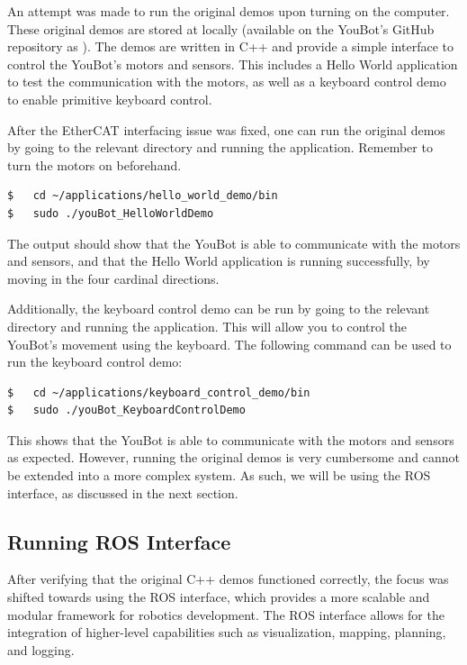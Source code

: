 \documentclass[a4paper, 12pt]{article}
\newif\ifshownotes
\newcommand{\notes}[1]{\ifshownotes\textcolor{blue}{#1}\fi}
\newcommand{\code}[1]{\texttt{\detokenize{#1}}}
\begin{document}
    An attempt was made to run the original demos upon turning on the computer. These original demos are stored at \code{~/applications} locally (available on the YouBot's GitHub repository as \code{youbot_applications}). The demos are written in C++ and provide a simple interface to control the YouBot's motors and sensors. This includes a Hello World application to test the communication with the motors, as well as a keyboard control demo to enable primitive keyboard control.

    
    After the EtherCAT interfacing issue was fixed, one can run the original demos by going to the relevant directory and running the application. Remember to turn the motors on beforehand. 
    \begin{lstlisting}[style=plain]
$   cd ~/applications/hello_world_demo/bin
$   sudo ./youBot_HelloWorldDemo
    \end{lstlisting}
    \notes{add the feedback from the demo here}
    
    The output should show that the YouBot is able to communicate with the motors and sensors, and that the Hello World application is running successfully, by moving in the four cardinal directions.

    Additionally, the keyboard control demo can be run by going to the relevant directory and running the application. This will allow you to control the YouBot's movement using the keyboard. The following command can be used to run the keyboard control demo:
    \begin{lstlisting}[style=plain]
$   cd ~/applications/keyboard_control_demo/bin
$   sudo ./youBot_KeyboardControlDemo
    \end{lstlisting}
    \notes{add the feedback from the demo here}

    This shows that the YouBot is able to communicate with the motors and sensors as expected. However, running the original demos is very cumbersome and cannot be extended into a more complex system. As such, we will be using the ROS interface, as discussed in the next section. 

    \pagebreak

    \subsection{Running ROS Interface}

    After verifying that the original C++ demos functioned correctly, the focus was shifted towards using the ROS interface, which provides a more scalable and modular framework for robotics development. The ROS interface allows for the integration of higher-level capabilities such as visualization, mapping, planning, and logging.
\end{document}
